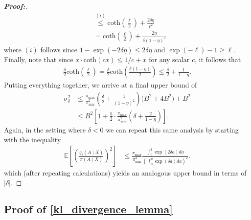 \documentclass[11pt,twoside]{article}
\theoremstyle{definition}
\theoremstyle{remark}
\begin{document}
\begin{proof}[\textbf{Proof:}]
\begin{align*}
    &\overset{(i)}{\leq} \text{coth}\left( \frac{\ell}{2} \right) + \frac{2 \delta \eta}{\ell^2} \\
    &= \text{coth}\left( \frac{\ell}{2} \right) + \frac{2 \eta}{\delta(1 - \eta)^2}
\end{align*}
where $(i)$ follows since $1 - \exp(-2\delta \eta) \leq 2 \delta \eta$ and $\exp(-\ell) - 1 \geq \ell$. Finally, note that since  $x \cdot \text{coth}(cx) \leq 1 / c + x$ for any scalar $c$, it follows that
\begin{align*}
    \frac{\delta}{2}\text{coth}\left( \frac{\ell}{2} \right) =  \frac{\delta}{2}\text{coth}\left( \frac{\delta(1 - \eta)}{2} \right) \leq \frac{\delta}{2} + \frac{1}{1 - \eta}.
\end{align*}
Putting everything together, we arrive at a final upper bound of
\begin{align*}
    \sigma^2_\delta &\leq  \frac{\pi_{\max}}{\pi^2_{\min}}\left(\frac{\delta}{2} +  \frac{1}{(1 - \eta)^2}\right) \Big( B^2 + 4B^2 \Big) + B^2 \\
    &\leq B^2 \left[1 + \frac{5}{2} \cdot \frac{\pi_{\max}}{\pi^2_{\min}} \left(\delta + \frac{2}{1 - \eta} \right) \right].
\end{align*}
Again, in the setting where $\delta < 0$ we can repeat this same analysis by starting with the inequality
\begin{align*}
     \mathbb{E}\left[\left(\frac{q_\delta(A \mid X)}{\pi(A \mid X)}\right)^2 \right] &\leq \frac{\pi_{\max}}{\pi^2_{\min}}\frac{\int^1_0 \exp(2 \delta a) da}{\left(\int^\eta_0 \exp(\delta a) da \right)^2}.
\end{align*}
which (after repeating calculations) yields an analogous upper bound in terms of $|\delta|$.
\end{proof}

\subsection{Proof of \texorpdfstring{\cref{kl_divergence_lemma}}{Proposition 2}} \label{kl_divergence_lemma_proof}
\end{document}
